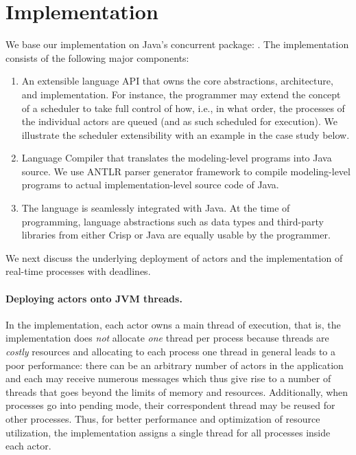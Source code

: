 \section{Implementation} \label{ch02:sec:impl}
We base our implementation on Java's concurrent package: . 
The implementation consists of the following major components:
\begin{enumerate}
 \item An extensible language API that owns the core abstractions, architecture, and implementation. 
For instance, the programmer may extend the concept of a scheduler to take full control of how, i.e., in what order, the processes of the individual actors are queued
(and as such scheduled for execution).
We illustrate the scheduler extensibility with an example in the case study below.
 \item Language Compiler that translates the modeling-level programs into Java source.
 We use ANTLR \cite{antlr} parser generator framework to compile modeling-level programs to actual implementation-level source code of Java.
 \item The language is seamlessly integrated with Java.
 At the time of programming, language abstractions such as data types and third-party libraries from either Crisp or Java are equally usable by the programmer.
\end{enumerate}

We next discuss the underlying deployment of actors and the implementation
of real-time  processes with deadlines.

\paragraph*{Deploying actors onto JVM threads.}
In the implementation, each actor owns a main thread of execution, that is,
the implementation does \emph{not} allocate \emph{one} thread per process because
threads are  \emph{costly} resources and
allocating to each process one thread in general leads to a poor performance:
there can be an arbitrary number of actors in the application and each may receive numerous messages which thus give rise to  a number of threads that  goes beyond the  limits of memory and resources.
Additionally, when processes go into pending mode, their correspondent thread may be reused for other processes.
Thus, for better performance and optimization of resource utilization, the implementation assigns a single thread for all processes inside each actor.


